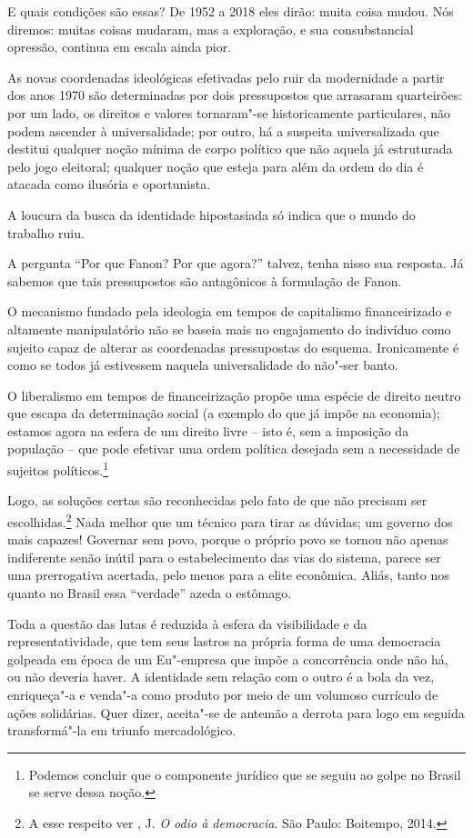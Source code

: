 E quais condições são essas? De 1952 a 2018 eles dirão: muita coisa
mudou. Nós diremos: muitas coisas mudaram, mas a exploração, e sua
consubstancial opressão, continua em escala ainda pior.

As novas coordenadas ideológicas efetivadas pelo ruir da modernidade a
partir dos anos 1970 são determinadas por dois pressupostos que
arrasaram quarteirões: por um lado, os direitos e valores tornaram"-se
historicamente particulares, não podem ascender à universalidade; por
outro, há a suspeita universalizada que destitui qualquer noção mínima
de corpo político que não aquela já estruturada pelo jogo eleitoral;
qualquer noção que esteja para além da ordem do dia é atacada como
ilusória e oportunista.

A loucura da busca da identidade hipostasiada só indica que o mundo do
trabalho ruiu.

A pergunta ``Por que Fanon? Por
que agora?'' talvez, tenha nisso sua resposta. Já sabemos que tais
pressupostos são antagônicos à formulação de Fanon.

O mecanismo fundado pela ideologia em tempos de capitalismo
financeirizado e altamente manipulatório não se baseia mais no
engajamento do indivíduo como sujeito capaz de alterar as coordenadas
pressupostas do esquema. Ironicamente é como se todos já estivessem
naquela universalidade do não"-ser banto.

O liberalismo em tempos de financeirização propõe uma espécie de direito
neutro que escapa da determinação social (a exemplo do que já impõe na
economia); estamos agora na esfera de um direito livre -- isto é, sem a
imposição da população -- que pode efetivar uma ordem política desejada
sem a necessidade de sujeitos políticos.\footnote{Podemos concluir que o
  componente jurídico que se seguiu ao golpe no Brasil se serve dessa
  noção.}

Logo, as soluções certas são reconhecidas pelo fato de que não precisam
ser escolhidas.\footnote{A esse respeito ver , J. \emph{O odio à
  democracia}. São Paulo: Boitempo, 2014.} Nada melhor que um técnico
para tirar as dúvidas; um governo dos mais capazes! Governar sem povo,
porque o próprio povo se tornou não apenas indiferente senão inútil para
o estabelecimento das vias do sistema, parece ser uma prerrogativa
acertada, pelo menos para a elite econômica. Aliás, tanto nos  quanto
no Brasil essa ``verdade'' azeda o estômago.

Toda a questão das lutas é reduzida à esfera da visibilidade e da
representatividade, que tem seus lastros na própria forma de uma
democracia golpeada em época de um Eu"-empresa que impõe a concorrência
onde não há, ou não deveria haver. A identidade sem relação com o outro
é a bola da vez, enriqueça"-a e venda"-a como produto por meio de um
volumoso currículo de ações solidárias. Quer dizer, aceita"-se de antemão
a derrota para logo em seguida transformá"-la em triunfo mercadológico.


